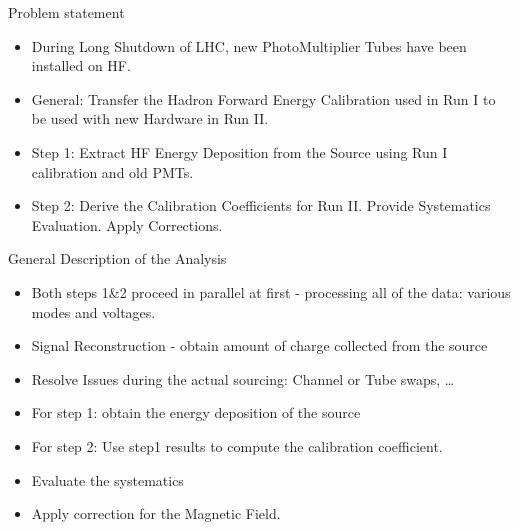 \documentclass[pdf, 9pt]{beamer}
\begin{document}
  \begin{frame}{Problem statement}
    \begin{itemize}
      \item During Long Shutdown of LHC, new PhotoMultiplier Tubes have been installed on HF.
      \item General: \alert{Transfer the Hadron Forward Energy Calibration used in Run I to be used with new Hardware in Run II.}
      \item Step 1: Extract HF Energy Deposition from the Source using Run I calibration and old PMTs.
      \item Step 2: Derive the Calibration Coefficients for Run II. Provide Systematics Evaluation. Apply Corrections.
    \end{itemize}
  \end{frame}


  \begin{frame}{General Description of the Analysis}
    \begin{itemize}
      \item Both steps 1\&2 proceed in parallel at first -  processing all of the data: various modes and voltages.
      \item Signal Reconstruction - obtain amount of charge collected from the source
      \item Resolve Issues during the actual sourcing: Channel or Tube swaps, \dots
      \item For step 1: obtain the energy deposition of the source
      \item For step 2: Use step1 results to compute the calibration coefficient.
      \item Evaluate the systematics
      \item Apply correction for the Magnetic Field.
    \end{itemize}
  \end{frame}
\end{document}
